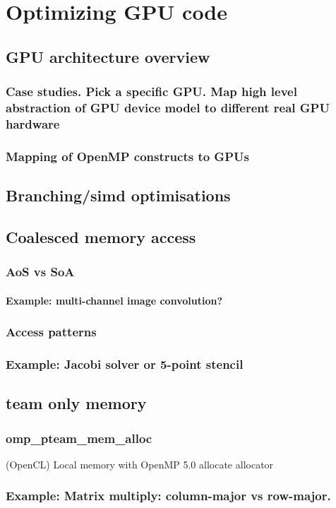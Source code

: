 
%
%
\chapter{Optimizing GPU code}

\section{GPU architecture overview}
\subsection{Case studies. Pick a specific GPU. Map high level abstraction of GPU device model to different real GPU hardware}
\subsection{Mapping of OpenMP constructs to GPUs}

%
%

\section{Branching/simd optimisations}

\section{Coalesced memory access}
\subsection{AoS vs SoA}
\subsubsection{Example: multi-channel image convolution?}

\subsection{Access patterns}
\subsection{Example: Jacobi solver or 5-point stencil}

\section{team only memory}
\subsection{omp\_pteam\_mem\_alloc}
(OpenCL) Local memory with OpenMP 5.0 allocate allocator
\subsection{Example: Matrix multiply: column-major vs row-major.}
